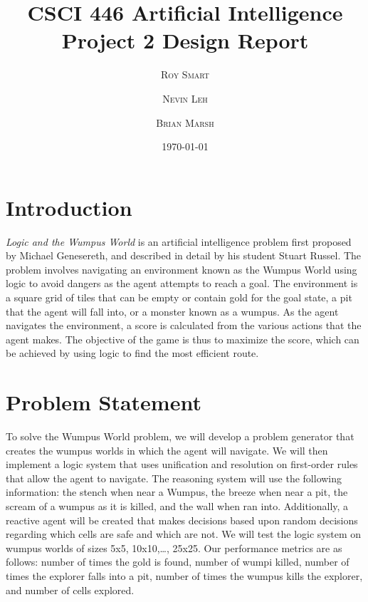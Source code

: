 \documentclass{article}
\title{\vspace{-15mm}\fontsize{24pt}{10pt}\selectfont\textbf{CSCI 446 Artificial Intelligence \\[2mm] Project 2 Design Report} } %
\date{\today}
\author{
\large
\textsc{Roy Smart} \and \textsc{Nevin Leh} \and \textsc{Brian Marsh}\\[2mm] %
}
\begin{document}
	\maketitle %
	\thispagestyle{fancy} %
	\normalsize

	\section{Introduction}
	
		\textit{Logic and the Wumpus World} is an artificial intelligence problem first proposed by Michael Genesereth, and described in detail by his student Stuart Russel\cite{ai}.  The problem involves navigating an environment known as the Wumpus World using logic to avoid dangers as the agent attempts to reach a goal.  The environment is a square grid of tiles that can be empty or contain gold for the goal state, a pit that the agent will fall into, or a monster known as a wumpus.  As the agent navigates the environment, a score is calculated from the various actions that the agent makes.  The objective of the game is thus to maximize the score, which can be achieved by using logic to find the most efficient route.
	
	\section{Problem Statement}

		To solve the Wumpus World problem, we will develop a problem generator that creates the wumpus worlds in which the agent will navigate.  We will then implement a logic system that uses unification and resolution on first-order rules that allow the agent to navigate.  The reasoning system will use the following information: the stench when near a Wumpus, the breeze when near a pit, the scream of a wumpus as it is killed, and the wall when ran into.  Additionally, a reactive agent will be created that makes decisions based upon random decisions regarding which cells are safe and which are not.  We will test the logic system on wumpus worlds of sizes {5x5, 10x10,…, 25x25}.  Our performance metrics are as follows: number of times the gold is found, number of wumpi killed, number of times the explorer falls into a pit, number of times the wumpus kills the explorer, and number of cells explored.
\end{document}
